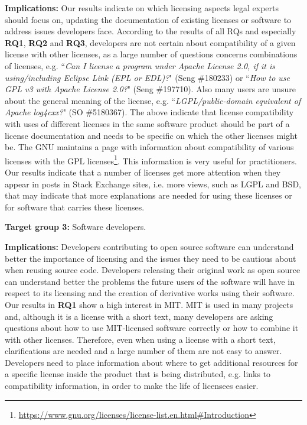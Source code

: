 \documentclass{elsarticle}
\begin{document}
\textbf{Implications:} Our results indicate on which licensing
aspects legal experts should focus on, updating the documentation of existing licenses or software to address issues developers face. 
According to the results of all RQs and especially \textbf{RQ1}, \textbf{RQ2} and \textbf{RQ3}, developers are not certain about compatibility of a given license with other licenses, as a large number of questions concerns combinations of licenses, e.g. ``\emph{Can I license a program under Apache License 2.0, if it is using/including Eclipse Link (EPL or EDL)?}" (Seng \#180233) or ``\emph{How to use GPL v3 with Apache License 2.0?}" (Seng \#197710). Also many users are unsure about the general meaning of the license, e.g. ``\emph{LGPL/public-domain equivalent of Apache log4cxx?}" (SO \#5180367). The above indicate that license compatibility with uses of different licenses in the same software product should be part of a license documentation and needs to be specific on which the other licenses might be. The GNU maintains a page with information about compatibility of various licenses with the GPL licenses\footnote{\url{https://www.gnu.org/licenses/license-list.en.html#Introduction}}. This information is very useful for practitioners. Our results indicate that a number of licenses get more attention when they appear in posts in Stack Exchange sites, i.e. more views, such as LGPL and BSD, that may indicate that more explanations are needed for using these licenses or for software that carries these licenses. 

\textbf{Target group 3:} Software developers.  

\textbf{Implications:} Developers contributing to open source software can understand better the importance of licensing and the issues they need to be cautious about when reusing source code. Developers releasing their original work as open source can understand better the problems the future users of the software will have in respect to its licensing and the creation of derivative works using their software. Our results in \textbf{RQ1} show a high interest in MIT. MIT is used in many projects and, although it is a license with a short text, many developers are asking questions about how to use MIT-licensed software correctly or how to combine it with other licenses. Therefore, even when using a license with a short text, clarifications are needed and a large number of them are not easy to answer. Developers need to place information about where to get additional resources for a specific license inside the product that is being distributed, e.g. links to compatibility information, in order to make the life of licensees easier.
\end{document}
